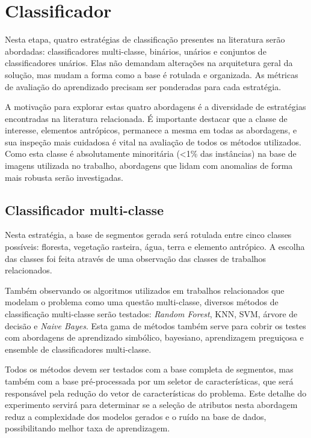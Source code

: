 \section{Classificador}\label{sec:metClassificador}

Nesta etapa, quatro estratégias de classificação presentes na literatura serão abordadas: classificadores multi-classe, binários, unários e conjuntos de classificadores unários. Elas não demandam alterações na arquitetura geral da solução, mas mudam a forma como a base é rotulada e organizada. As métricas de avaliação do aprendizado precisam ser ponderadas para cada estratégia.

A motivação para explorar estas quatro abordagens é a diversidade de estratégias encontradas na literatura relacionada. É importante destacar que a classe de interesse, elementos antrópicos, permanece a mesma em todas as abordagens, e sua inspeção mais cuidadosa é vital na avaliação de todos os métodos utilizados. Como esta classe é absolutamente minoritária (<1\% das instâncias) na base de imagens utilizada no trabalho, abordagens que lidam com anomalias de forma mais robusta serão investigadas.

\subsection{Classificador multi-classe}

Nesta estratégia, a base de segmentos gerada será rotulada entre cinco classes possíveis: floresta, vegetação rasteira, água, terra e elemento antrópico. A escolha das classes foi feita através de uma observação das classes de trabalhos relacionados.

Também observando os algoritmos utilizados em trabalhos relacionados que modelam o problema como uma questão multi-classe, diversos métodos de classificação multi-classe serão testados: \textit{Random Forest}, KNN, SVM, árvore de decisão e \textit{Naive Bayes}. Esta gama de métodos também serve para cobrir os testes com abordagens de aprendizado simbólico, bayesiano, aprendizagem preguiçosa e ensemble de classificadores multi-classe.

Todos os métodos devem ser testados com a base completa de segmentos, mas também com a base pré-processada por um seletor de características, que será responsável pela redução do vetor de características do problema. Este detalhe do experimento servirá para determinar se a seleção de atributos nesta abordagem reduz a complexidade dos modelos gerados e o ruído na base de dados, possibilitando melhor taxa de aprendizagem.

